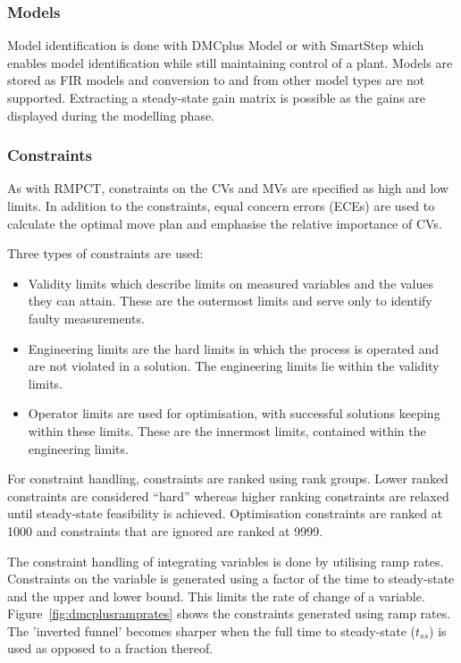 \subsubsection{Models}
Model identification is done with DMCplus Model or with SmartStep which enables model identification while still maintaining control of a plant.
Models are stored as FIR models and conversion to and from other model types are not supported.
Extracting a steady-state gain matrix is possible as the gains are displayed during the modelling phase.

\subsubsection{Constraints}\label{sec:dmcpluscons}
As with RMPCT, constraints on the CVs and MVs are specified as high and low limits.
In addition to the constraints, equal concern errors (ECEs) are used to calculate the optimal move plan and emphasise the relative importance of CVs.

Three types of constraints are used:
\begin{itemize}
\item Validity limits which describe limits on measured variables and the values they can attain.
These are the outermost limits and serve only to identify faulty measurements.
\item Engineering limits are the hard limits in which the process is operated and are not violated in a solution.
The engineering limits lie within the validity limits.
\item Operator limits are used for optimisation, with successful solutions keeping within these limits.
These are the innermost limits, contained within the engineering limits.
\end{itemize}

For constraint handling, constraints are ranked using rank groups.
Lower ranked constraints are considered ``hard'' whereas higher ranking constraints are relaxed until steady-state feasibility is achieved.
Optimisation constraints are ranked at 1000 and constraints that are ignored are ranked at 9999.

The constraint handling of integrating variables is done by utilising ramp rates.
Constraints on the variable is generated using a factor of the time to steady-state and the upper and lower bound.
This limits the rate of change of a variable.
Figure~\ref{fig:dmcplusramprates} shows the constraints generated using ramp rates.
The 'inverted funnel' becomes sharper when the full time to steady-state ($t_{ss}$) is used as opposed to a fraction thereof.

